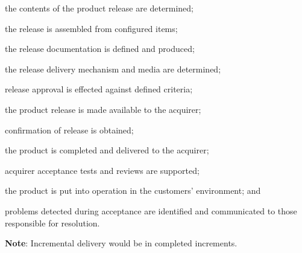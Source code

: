 			\begin{adjustwidth}{2em}{0pt} 

				\begin{compactitem}

					\item the contents of the product release are determined;

					\item the release is assembled from configured items;

					\item the release documentation is defined and produced;

					\item the release delivery mechanism and media are determined;

					\item release approval is effected against defined criteria;

					\item the product release is made available to the acquirer;

					\item confirmation of release is obtained;

					\item the product is completed and delivered to the acquirer;

					\item acquirer acceptance tests and reviews are supported;

					\item the product is put into operation in the customers’ environment; and

					\item problems detected during acceptance are identified and communicated to those responsible for resolution.

				\end{compactitem}

			{\bf Note}: Incremental delivery would be in completed increments.

			\end{adjustwidth}


	\newpage

